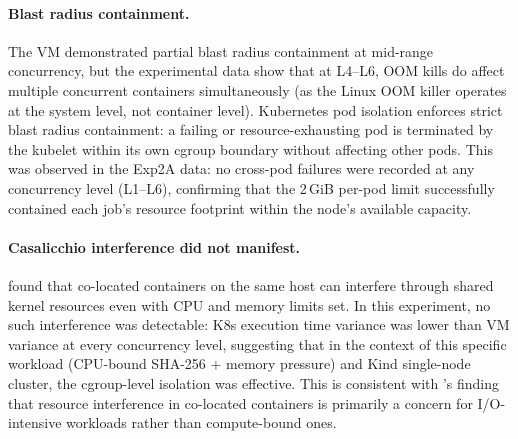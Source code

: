 \paragraph{Blast radius containment.}
The VM demonstrated partial blast radius containment at mid-range concurrency, but the experimental data show that at L4--L6, OOM kills do affect multiple concurrent containers simultaneously (as the Linux OOM killer operates at the system level, not container level).
Kubernetes pod isolation enforces strict blast radius containment: a failing or resource-exhausting pod is terminated by the kubelet within its own cgroup boundary without affecting other pods.
This was observed in the Exp2A data: no cross-pod failures were recorded at any concurrency level (L1--L6), confirming that the 2\,GiB per-pod limit successfully contained each job's resource footprint within the node's available capacity.

\paragraph{Casalicchio interference did not manifest.}
\citet{casalicchio2019} found that co-located containers on the same host can interfere through shared kernel resources even with CPU and memory limits set.
In this experiment, no such interference was detectable: K8s execution time variance was lower than VM variance at every concurrency level, suggesting that in the context of this specific workload (CPU-bound SHA-256 + memory pressure) and Kind single-node cluster, the cgroup-level isolation was effective.
This is consistent with \citet{choi2021}'s finding that resource interference in co-located containers is primarily a concern for I/O-intensive workloads rather than compute-bound ones.

